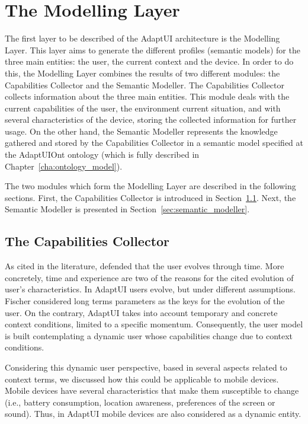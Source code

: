 \section{The Modelling Layer}
\label{sec:modelling_layer}

The first layer to be described of the AdaptUI architecture is the Modelling
Layer. This layer aims to generate the different profiles (semantic models) for
the three main entities: the user, the current context and the device. In order
to do this, the Modelling Layer combines the results of two different modules: 
the Capabilities Collector and the Semantic Modeller. The Capabilities Collector
collects information about the three main entities. This module deals with the
current capabilities of the user, the environment current situation, and with
several characteristics of the device, storing the collected information for
further usage. On the other hand, the Semantic Modeller represents the knowledge
gathered and stored by the Capabilities Collector in a semantic model specified
at the AdaptUIOnt ontology (which is fully described in 
Chapter~\ref{cha:ontology_model}). 

The two modules which form the Modelling Layer are described in the following
sections. First, the Capabilities Collector is introduced in
Section~\ref{sec:capabilities_collector}. Next, the Semantic Modeller is
presented in Section~\ref{sec:semantic_modeller}.


\subsection{The Capabilities Collector}
\label{sec:capabilities_collector}

As cited in the literature, \citet{fischer_user_2001} defended that the user
evolves through time. More concretely, time and experience are two of the 
reasons for the cited evolution of user's characteristics. In AdaptUI users 
evolve, but under different assumptions. Fischer considered long terms 
parameters as the keys for the evolution of the user. On the contrary, AdaptUI 
takes into account temporary and concrete context conditions, limited to a 
specific momentum. Consequently, the user model is built contemplating a dynamic 
user whose capabilities change due to context conditions.

Considering this dynamic user perspective, based in several aspects related to
context terms, we discussed how this could be applicable to mobile devices. 
Mobile devices have several characteristics that make them susceptible to change 
(i.e., battery consumption, location awareness, preferences of the screen or 
sound). Thus, in AdaptUI mobile devices are also considered as a dynamic entity.

